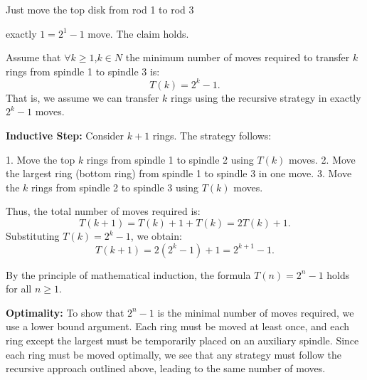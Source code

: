 \documentclass{article}
\begin{document}
Just move the top disk from rod 1 to rod 3 

exactly \( 1 = 2^1 - 1 \) move. The claim holds.

\bigskip

\text Assume that \(\forall k \geq 1 \),$k\in N$ the minimum number of moves required to transfer \( k \) rings from spindle 1 to spindle 3 is:
\[
T(k) = 2^k - 1.
\]
That is, we assume we can transfer \( k \) rings using the recursive strategy in exactly \( 2^k - 1 \) moves.

\bigskip

\textbf{Inductive Step:} Consider \( k+1 \) rings. The strategy follows:

1. Move the top \( k \) rings from spindle 1 to spindle 2 using \( T(k) \) moves.
2. Move the largest ring (bottom ring) from spindle 1 to spindle 3 in one move.
3. Move the \( k \) rings from spindle 2 to spindle 3 using \( T(k) \) moves.

Thus, the total number of moves required is:
\[
T(k+1) = T(k) + 1 + T(k) = 2T(k) + 1.
\]
Substituting \( T(k) = 2^k - 1 \), we obtain:
\[
T(k+1) = 2(2^k - 1) + 1 = 2^{k+1} - 1.
\]

By the principle of mathematical induction, the formula \( T(n) = 2^n - 1 \) holds for all \( n \geq 1 \).

\bigskip

\textbf{Optimality:} To show that \( 2^n - 1 \) is the minimal number of moves required, we use a lower bound argument. Each ring must be moved at least once, and each ring except the largest must be temporarily placed on an auxiliary spindle. Since each ring must be moved optimally, we see that any strategy must follow the recursive approach outlined above, leading to the same number of moves.
\end{document}
